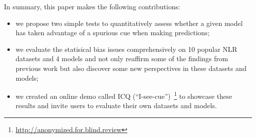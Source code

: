 




In summary, this paper makes the following contributions:
\begin{itemize}
\item we propose two simple tests to quantitatively 
assess whether a given model has taken advantage of a
spurious cue when making predictions;

\item we evaluate the statisical bias issues comprehensively on
10 popular NLR datasets and 4 models and not only reaffirm
some of the findings from previous work but also discover some
new perspectives in these datasets and models;

\item we created an online demo called ICQ 
(``I-see-cue'')~\footnote{\url{http://anonymized.for.blind.review}}  to showcase
these results and invite users to evaluate their own datasets and models.
\end{itemize}








